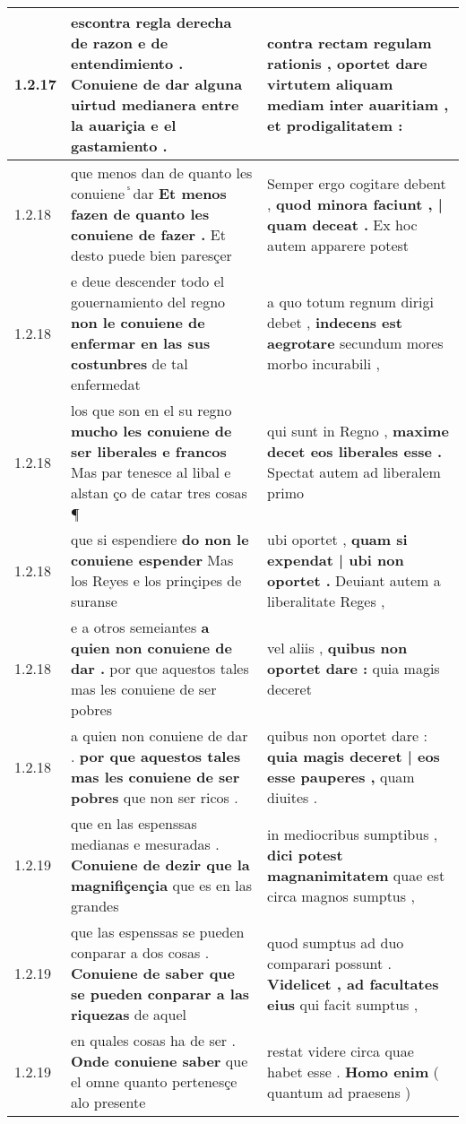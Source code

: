 \begin{tabular}{|p{1cm}|p{6.5cm}|p{6.5cm}|}
1.2.17 & escontra regla derecha de razon e de entendimiento . \textbf{ Conuiene de dar alguna uirtud medianera } entre la auariçia e el gastamiento . & contra rectam regulam rationis , \textbf{ oportet dare virtutem aliquam mediam } inter auaritiam , et prodigalitatem : \\\hline
1.2.18 & que menos dan de quanto les conuiene ᷤ dar \textbf{ Et menos fazen de quanto les conuiene de fazer . } Et desto puede bien paresçer & Semper ergo cogitare debent , \textbf{ quod minora faciunt , | quam deceat . } Ex hoc autem apparere potest \\\hline
1.2.18 & e deue descender todo el gouernamiento del regno \textbf{ non le conuiene de enfermar en las sus costunbres } de tal enfermedat & a quo totum regnum dirigi debet , \textbf{ indecens est aegrotare } secundum mores morbo incurabili , \\\hline
1.2.18 & los que son en el su regno \textbf{ mucho les conuiene de ser liberales e francos } Mas par tenesce al libal e alstan ço de catar tres cosas ¶ & qui sunt in Regno , \textbf{ maxime decet eos liberales esse . } Spectat autem ad liberalem primo \\\hline
1.2.18 & que si espendiere \textbf{ do non le conuiene espender } Mas los Reyes e los prinçipes de suranse & ubi oportet , \textbf{ quam si expendat | ubi non oportet . } Deuiant autem a liberalitate Reges , \\\hline
1.2.18 & e a otros semeiantes \textbf{ a quien non conuiene de dar . } por que aquestos tales mas les conuiene de ser pobres & vel aliis , \textbf{ quibus non oportet dare : } quia magis deceret \\\hline
1.2.18 & a quien non conuiene de dar . \textbf{ por que aquestos tales mas les conuiene de ser pobres } que non ser ricos . & quibus non oportet dare : \textbf{ quia magis deceret | eos esse pauperes , } quam diuites . \\\hline
1.2.19 & que en las espenssas medianas e mesuradas . \textbf{ Conuiene de dezir que la magnifiçençia } que es en las grandes & in mediocribus sumptibus , \textbf{ dici potest magnanimitatem } quae est circa magnos sumptus , \\\hline
1.2.19 & que las espenssas se pueden conparar a dos cosas . \textbf{ Conuiene de saber que se pueden conparar a las riquezas } de aquel & quod sumptus ad duo comparari possunt . \textbf{ Videlicet , ad facultates eius } qui facit sumptus , \\\hline
1.2.19 & en quales cosas ha de ser . \textbf{ Onde conuiene saber } que el omne quanto pertenesçe alo presente & restat videre circa quae habet esse . \textbf{ Homo enim } ( quantum ad praesens ) \\\hline

\end{tabular}
